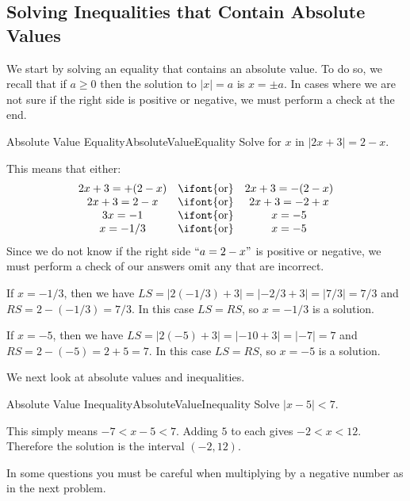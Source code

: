 \subsection{Solving Inequalities that Contain Absolute Values}
We start by solving an equality that contains an absolute value.
To do so, we recall that if $a\geq 0$ then the solution to 
$|x|=a$ is $x=\pm a$. In cases where we are not sure if the right 
side is positive or negative, we must perform a check at the end. \\

\begin{example}{Absolute Value Equality}{AbsoluteValueEquality}
Solve for $x$ in $|2x+3|=2-x$.
\end{example}

\begin{solution} 
This means that either:
\[\begin{array}{ccc}
	2x+3=+(2-x) & \mbox{\ifont{or}} & 2x+3=-(2-x)\\
	2x+3=2-x & \mbox{\ifont{or}} & 2x+3=-2+x\\
	3x=-1 & \mbox{\ifont{or}} & x=-5\\
	x=-1/3 & \mbox{\ifont{or}} & x=-5\\
\end{array}\]
Since we do not know if the right side $``a=2-x"$ is positive or negative, we must perform a check of our answers omit any that are incorrect.

If $x=-1/3$, then we have $LS=|2(-1/3)+3|=|-2/3+3|=|7/3|=7/3$ and $RS=2-(-1/3)=7/3$.
In this case $LS=RS$, so $x=-1/3$ is a solution.

If $x=-5$, then we have $LS=|2(-5)+3|=|-10+3|=|-7|=7$ and $RS=2-(-5)=2+5=7$.
In this case $LS=RS$, so $x=-5$ is a solution.
\end{solution}

We next look at absolute values and inequalities. \\

\begin{example}{Absolute Value Inequality}{AbsoluteValueInequality}
Solve $|x-5|<7$.
\end{example}

\begin{solution} 
This simply means $-7<x-5<7$.
Adding $5$ to each gives $-2<x<12$.
Therefore the solution is the interval $(-2,12)$.
\end{solution}

In some questions you must be careful when multiplying by a negative number as in the next problem. \\

